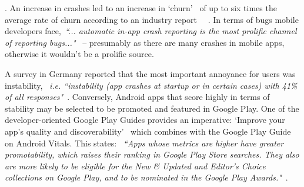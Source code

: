 \medskip
{}. An increase in crashes led to an increase in `churn'~ of up to six times the average rate of churn according to an industry report ~~. %
In terms of bugs mobile developers face,~\emph{``... automatic in-app crash reporting is the most prolific channel of reporting bugs..."}~ %
-- presumably as there are many crashes in mobile apps, otherwise it wouldn't be a prolific source. 

A survey in Germany reported that the most important annoyance for users was instability, ~\emph{i.e. ``instability (app crashes at startup or in certain cases) with 41\% of all responses"}~.  %
%
Conversely, Android apps that score highly in terms of stability may be selected to be promoted and featured in Google Play. One of the developer-oriented Google Play Guides provides an imperative: `Improve your app’s quality and discoverability'~ which combines with the Google Play Guide on Android Vitals. This states: ~\emph{``Apps whose metrics are higher have greater promotability, which raises their ranking in Google Play Store searches. They also are more likely to be eligible for the New \& Updated and Editor's Choice collections on Google Play, and to be nominated in the Google Play Awards."}~. %


